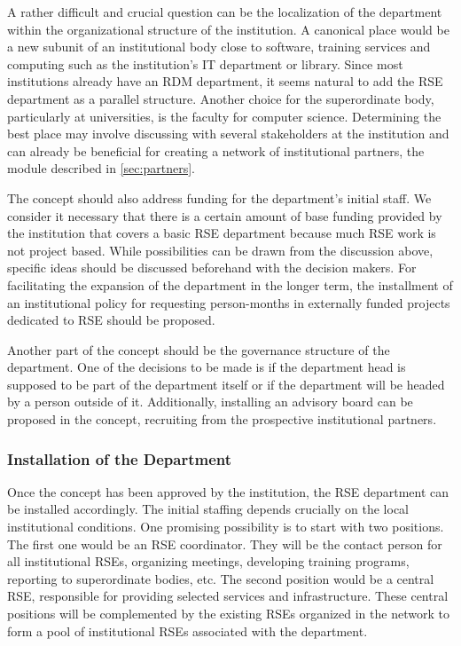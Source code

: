 \documentclass[a4paper]{article}
\begin{document}
A rather difficult and crucial question can be the localization of the department within the organizational structure of the institution.
A canonical place would be a new subunit of an institutional body close to software,
training services and computing such as the institution's IT department or library.
Since most institutions already have an RDM department, it seems natural to add the RSE department as a parallel structure.
Another choice for the superordinate body, particularly at universities, is the faculty for computer science.
Determining the best place may involve discussing with several stakeholders at the institution and can already be beneficial for creating a
network of institutional partners, the module described in \autoref{sec:partners}.

The concept should also address funding for the department's initial staff.
We consider it necessary that there is a certain amount of base funding provided by the institution that covers a basic RSE department because much RSE work is not project based.
While possibilities can be drawn from the discussion above, specific ideas should be discussed beforehand with the decision makers.
For facilitating the expansion of the department in the longer term, the installment of an institutional policy for requesting person-months in externally funded projects dedicated to RSE should be proposed.

Another part of the concept should be the governance structure of the department.
One of the decisions to be made is if the department head is supposed to be part of the department itself or if the department will be headed by a person outside of it.
Additionally, installing an advisory board can be proposed in the concept, recruiting from the prospective institutional partners.

\subsubsection{Installation of the Department}
Once the concept has been approved by the institution, the RSE department can be installed accordingly.
The initial staffing depends crucially on the local institutional conditions. 
One promising possibility is to start with two positions. The first one would be an RSE coordinator.
They will be the contact person for all institutional RSEs, organizing meetings, developing training programs, reporting to superordinate bodies, etc.
The second position would be a central RSE, responsible for providing selected services and infrastructure.
These central positions will be complemented by the existing RSEs organized in the network to form a pool of institutional RSEs associated with the department.
\end{document}
